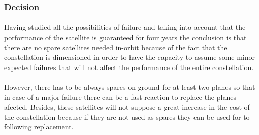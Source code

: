 \subsubsection{Decision}
\paragraph{}Having studied all the possibilities of failure and taking into account that the porformance of the satellite is guaranteed for four years the conclusion is that there are no spare satellites needed in-orbit because of the fact that the constellation is dimensioned in order to have the capacity to assume some minor expected failures that will not affect the performance of the entire constellation.

\paragraph{}However, there has to be always spares on ground for at least two planes so that in case of a major failure there can be a fast reaction to replace the planes afected. Besides, these satellites will not suppose a great increase in the cost of the constellation because if they are not used as spares they can be used for to following replacement. 


 